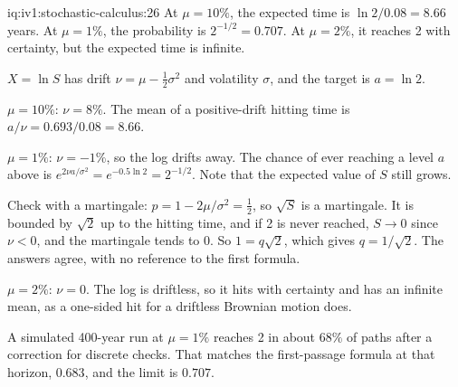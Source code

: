 \begin{solution}{iq:iv1:stochastic-calculus:26}
At $\mu = 10\%$, the expected time is $\ln 2/0.08 = 8.66$ years. At $\mu = 1\%$, the probability is $2^{-1/2} = 0.707$. At $\mu = 2\%$, it reaches 2 with certainty, but the expected time is infinite.

$X = \ln S$ has drift $\nu = \mu - \frac12\sigma^2$ and volatility $\sigma$, and the target is $a = \ln 2$.

$\mu = 10\%$: $\nu = 8\%$. The mean of a positive-drift hitting time is $a/\nu = 0.693/0.08 = 8.66$.

$\mu = 1\%$: $\nu = -1\%$, so the log drifts away. The chance of ever reaching a level $a$ above is $e^{2\nu a/\sigma^2} = e^{-0.5\ln 2} = 2^{-1/2}$. Note that the expected value of $S$ still grows.

Check with a martingale: $p = 1 - 2\mu/\sigma^2 = \frac12$, so $\sqrt{S}$ is a martingale. It is bounded by $\sqrt{2}$ up to the hitting time, and if 2 is never reached, $S \to 0$ since $\nu < 0$, and the martingale tends to 0. So $1 = q\sqrt{2}$, which gives $q = 1/\sqrt{2}$. The answers agree, with no reference to the first formula.

$\mu = 2\%$: $\nu = 0$. The log is driftless, so it hits with certainty and has an infinite mean, as a one-sided hit for a driftless Brownian motion does.

A simulated 400-year run at $\mu = 1\%$ reaches 2 in about $68\%$ of paths after a correction for discrete checks. That matches the first-passage formula at that horizon, $0.683$, and the limit is $0.707$.



\end{solution}

